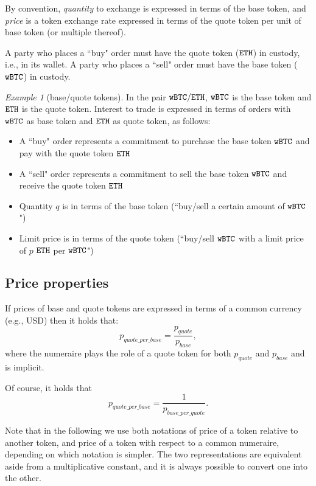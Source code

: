 \documentclass[11pt, reqno]{amsart}
\theoremstyle{definition}
\theoremstyle{remark}
\newtheorem{exmp}{Example}[subsection]
\newcommand{\BTC}{\textnormal{\texttt{wBTC}}}
\newcommand{\ETH}{\textnormal{\texttt{ETH}}}
\begin{document}
By convention, \emph{quantity} to exchange is expressed in terms of the base
token, and \emph{price} is a token exchange rate expressed in terms of the
quote token per unit of base token (or multiple thereof).

A party who places a ``buy" order must have the quote token ($\ETH$) in custody,
i.e., in its wallet. A party who places a ``sell" order must have the base
token ($\BTC$) in custody.

\begin{exmp}[base/quote tokens]
In the pair $\BTC/\ETH$, $\BTC$ is the base token and $\ETH$
is the quote token. Interest to trade is expressed in terms of orders
with $\BTC$ as base token and $\ETH$ as quote token, as follows:
\begin{itemize}
    \item A ``buy" order represents a commitment to purchase the base token
          $\BTC$ and pay with the quote token $\ETH$
    \item A ``sell" order represents a commitment to sell the base token
          $\BTC$ and receive the quote token $\ETH$
    \item Quantity $q$ is in terms of the base token (``buy/sell a certain
          amount of $\BTC$")
    \item Limit price is in terms of the quote token (``buy/sell $\BTC$ with a
          limit price of $p$ $\ETH$ per $\BTC$")
\end{itemize}
\end{exmp}

\subsection{Price properties}
If prices of base and quote tokens are expressed in terms of a common currency
(e.g., USD) then it holds that:
\[
    p_{quote\_per\_base} = \frac{p_{quote}}{p_{base}},
\]
where the numeraire plays the role of a quote token for both $p_{quote}$ and
$p_{base}$ and is implicit.

Of course, it holds that
\[
    p_{quote\_per\_base} =
    \frac{1}{p_{base\_per\_quote}}.
\]

Note that in the following we use both notations of price of a token relative to
another token, and price of a token with respect to a common numeraire, depending
on which notation is simpler.
The two representations are equivalent aside from a multiplicative constant, and
it is always possible to convert one into the other.
\end{document}
